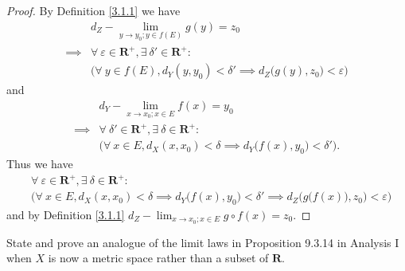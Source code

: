 \begin{proof}
    By Definition \ref{3.1.1} we have
    \begin{align*}
                 & d_Z - \lim_{y \to y_0 ; y \in f(E)} g(y) = z_0                                                     \\
        \implies & \forall\ \varepsilon \in \mathbf{R}^+, \exists\ \delta' \in \mathbf{R}^+ :                         \\
                 & \Big(\forall\ y \in f(E), d_Y(y, y_0) < \delta' \implies d_Z\big(g(y), z_0\big) < \varepsilon\Big)
    \end{align*}
    and
    \begin{align*}
                 & d_Y - \lim_{x \to x_0 ; x \in E} f(x) = y_0                                                 \\
        \implies & \forall\ \delta' \in \mathbf{R}^+, \exists\ \delta \in \mathbf{R}^+ :                       \\
                 & \Big(\forall\ x \in E, d_X(x, x_0) < \delta \implies d_Y\big(f(x), y_0\big) < \delta'\Big).
    \end{align*}
    Thus we have
    \begin{align*}
         & \forall\ \varepsilon \in \mathbf{R}^+, \exists\ \delta \in \mathbf{R}^+ :                                                                             \\
         & \bigg(\forall\ x \in E, d_X(x, x_0) < \delta \implies d_Y\big(f(x), y_0\big) < \delta' \implies d_Z\Big(g\big(f(x)\big), z_0\Big) < \varepsilon\bigg)
    \end{align*}
    and by Definition \ref{3.1.1} \(d_Z - \lim_{x \to x_0 ; x \in E} g \circ f(x) = z_0\).
\end{proof}

\begin{exercise}\label{ex 3.1.6}
    State and prove an analogue of the limit laws in Proposition 9.3.14 in Analysis I when \(X\) is now a metric space rather than a subset of \(\mathbf{R}\).
\end{exercise}

